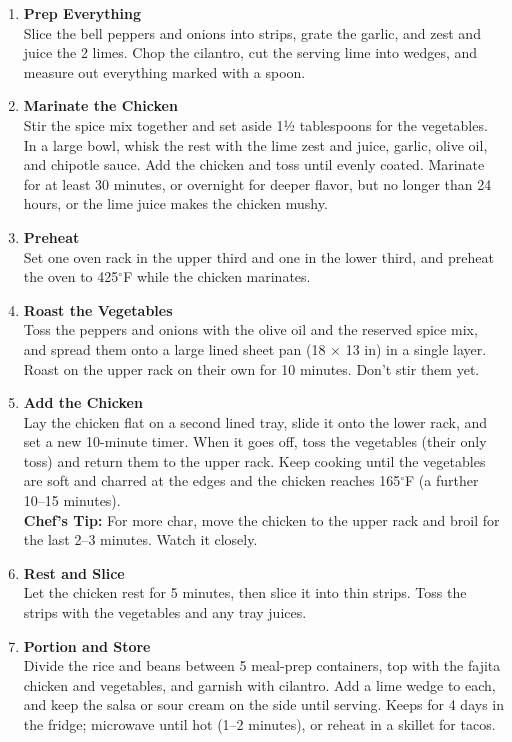 \begin{enumerate}

      \item \textbf{Prep Everything} \\
            Slice the bell peppers and onions into strips, grate the garlic, and zest and juice the 2 limes. Chop the cilantro, cut the serving lime into wedges, and measure out everything marked with a spoon.

      \item \textbf{Marinate the Chicken} \\
            Stir the spice mix together and set aside 1½ tablespoons for the vegetables. In a large bowl, whisk the rest with the lime zest and juice, garlic, olive oil, and chipotle sauce. Add the chicken and toss until evenly coated. Marinate for at least 30 minutes, or overnight for deeper flavor, but no longer than 24 hours, or the lime juice makes the chicken mushy.

      \item \textbf{Preheat} \\
            Set one oven rack in the upper third and one in the lower third, and preheat the oven to 425$^\circ$F while the chicken marinates.

      \item \textbf{Roast the Vegetables} \\
            Toss the peppers and onions with the olive oil and the reserved spice mix, and spread them onto a large lined sheet pan (18 $\times$ 13 in) in a single layer. Roast on the upper rack on their own for 10 minutes. Don't stir them yet.

      \item \textbf{Add the Chicken} \\
            Lay the chicken flat on a second lined tray, slide it onto the lower rack, and set a new 10-minute timer. When it goes off, toss the vegetables (their only toss) and return them to the upper rack. Keep cooking until the vegetables are soft and charred at the edges and the chicken reaches 165$^\circ$F (a further 10--15 minutes). \\
            \textbf{Chef's Tip:} For more char, move the chicken to the upper rack and broil for the last 2--3 minutes. Watch it closely.

      \item \textbf{Rest and Slice} \\
            Let the chicken rest for 5 minutes, then slice it into thin strips. Toss the strips with the vegetables and any tray juices.

      \item \textbf{Portion and Store} \\
            Divide the rice and beans between 5 meal-prep containers, top with the fajita chicken and vegetables, and garnish with cilantro. Add a lime wedge to each, and keep the salsa or sour cream on the side until serving. Keeps for 4 days in the fridge; microwave until hot (1--2 minutes), or reheat in a skillet for tacos.

\end{enumerate}



